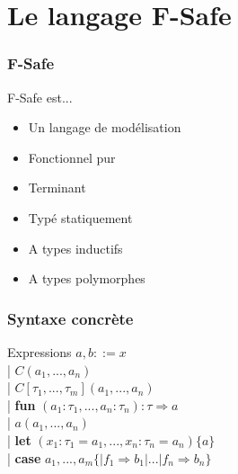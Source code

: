 \section{Le langage F-Safe}

\begin{frame}
  \frametitle{F-Safe}
  \begin{block}{F-Safe est...}
    \begin{itemize}
      \item Un langage de modélisation
      \item Fonctionnel pur
      \item Terminant
      \item Typé statiquement
      \item A types inductifs
      \item A types polymorphes
    \end{itemize}
  \end{block}
\end{frame}

\begin{frame}
  \frametitle{Syntaxe concrète}
  \begin{block}{Expressions}
    $a, b ::= x$ \\
    \hspace{1,2cm}| $C(a_1, ..., a_n)$ \\
    \hspace{1,2cm}| $C[\tau_1, ..., \tau_m](a_1, ..., a_n)$ \\
    \hspace{1,2cm}| \textbf{fun} $(a_1:\tau_1, ..., a_n:\tau_n) : \tau \Rightarrow a$ \\
    \hspace{1,2cm}| $a(a_1, ..., a_n)$ \\
    \hspace{1,2cm}| \textbf{let} $(x_1:\tau_1 = a_1, ..., x_n:\tau_n = a_n) \{ a \}$ \\
    \hspace{1,2cm}| \textbf{case} $a_1, ..., a_m \{ | f_1 \Rightarrow b_1 | ... | f_n \Rightarrow b_n \}$
  \end{block}
\end{frame}



